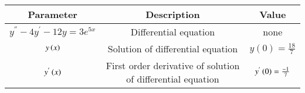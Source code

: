 \begin{tabular}[12pt]{ |c| c|c|}
    \hline
    \textbf{Parameter} & \textbf{Description} & \textbf{Value}\\ 
    \hline
    $y^{''} -  4y^{'} -12y = 3e^{5x}$ & Differential equation & none\\
    \hline
    $y\left(x\right)$ &Solution of  differential equation & $y(0)=\frac{18}{7}$\\
    \hline
    $y^{'}\left(x\right)$ & First order derivative of solution of differential equation & $y^{'}\left(0\right)=\frac{-1}{7}$\\
    \hline
     \end{tabular} 
